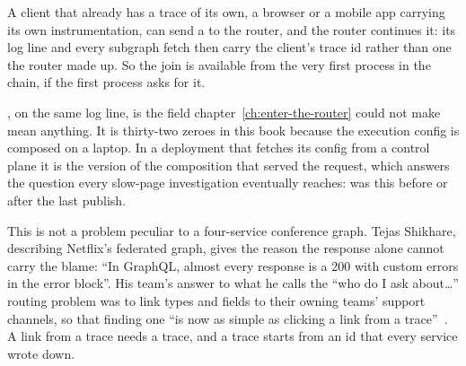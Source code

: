 %
A client that already has a trace of its own, a browser or a mobile app carrying its own
instrumentation, can send a  to the router, and the router
continues it: its log line and every subgraph fetch then carry the client's
trace id rather than one the router made up. So the join is available from
the very first process in the chain, if the first process asks for it.

%
, on the same log line, is the field
chapter~\ref{ch:enter-the-router} could not make mean anything. It is
thirty-two zeroes in this book because the execution
config is composed on a laptop. In a deployment that fetches its config from a
control plane it is the version of the composition that served the request,
which answers the question every slow-page investigation eventually reaches:
was this before or after the last publish.

%
This is not a problem peculiar to a four-service conference graph. Tejas
Shikhare, describing Netflix's federated graph, gives the reason the response
alone cannot carry the blame: \enquote{In GraphQL, almost every response is a
200 with custom errors in the error block}. His team's answer to what he calls
the \enquote{who do I ask about\ldots} routing problem was to link types and
fields to their owning teams' support channels, so that finding one \enquote{is
now as simple as clicking a link from a trace}~\autocite{shikhare2020part2}. A
link from a trace needs a trace, and a trace starts from an id that every
service wrote down.
%
